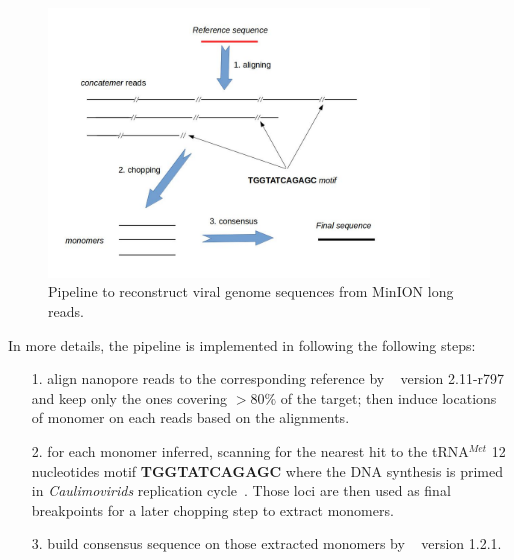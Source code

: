 \begin{figure}[ht]
\centerline{\includegraphics[width=0.9\textwidth]{images/concatemer.jpg}}
\caption{Pipeline to reconstruct viral genome sequences from MinION long reads.}
\label{fig:concat_ref_workflow}
\end{figure}

In more details, the pipeline is implemented in following the following steps: 
\begin{itemize}
\item[1.] align nanopore reads to the corresponding reference by \minimap{}~\cite{Li2016} version 2.11-r797 and keep only the ones covering $>80\%$ of the target; then induce locations of monomer on each reads based on the alignments.
\item[2.] for each monomer inferred, scanning for the nearest hit to the tRNA$^{Met}$ 12 nucleotides motif \textbf{TGGTATCAGAGC} where the DNA synthesis is primed in \emph{Caulimovirids} replication cycle~\cite{Bhat2016badnaviruses,Sukal2018characterization}. Those loci are then used as final breakpoints for a later chopping step to extract monomers.
\item[3.] build consensus sequence on those extracted monomers by \racon{}~\cite{Vaser2017racon} version 1.2.1.
\end{itemize}

